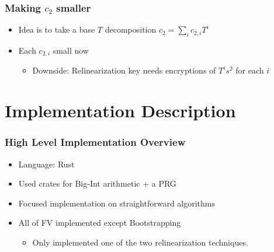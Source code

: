 \documentclass{beamer}
\theoremstyle{definition}
\begin{document}
\begin{frame}
	\frametitle{Making $c_2$ smaller}
	\begin{itemize}
	\item Idea is to take a base $T$ decomposition $c_2 = \sum_i c_{2,i}T^i$\pause{}
	\item Each $c_{2,i}$ \alert{small} now\pause{}
	\begin{itemize}
		\item Downside: Relinearization key needs encryptions of $T^is^2$ for each $i$
	\end{itemize}
\end{itemize}
\end{frame}


\section{Implementation Description} 

\begin{frame}
	\frametitle{High Level Implementation Overview}
	\begin{itemize}
		\item Language: Rust\pause{}
		\item Used crates for Big-Int arithmetic + a PRG\pause{}
		\item Focused implementation on straightforward algorithms\pause{}
		\item All of FV implemented except Bootstrapping\pause{}
		\begin{itemize}
			\item Only implemented one of the two relinearization techniques.\pause{}
		\end{itemize}
	\end{itemize}
\end{frame}
\end{document}
